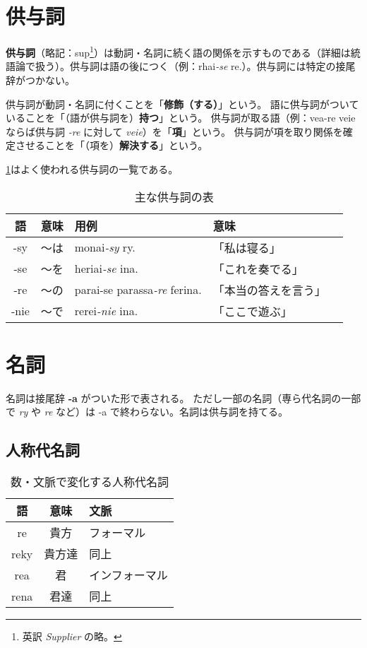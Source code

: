 \section{供与詞}

\textbf{供与詞}（略記：sup\footnote{英訳 \emph{Supplier} の略。}）は動詞・名詞に続く語の関係を示すものである（詳細は統語論で扱う）。供与詞は語の後につく（例：rhai\emph{-se} re.）。供与詞には特定の接尾辞がつかない。

供与詞が動詞・名詞に付くことを「\textbf{修飾（する）}」という。
語に供与詞がついていることを「（語が供与詞を）\textbf{持つ}」という。
供与詞が取る語（例：vea-re veie ならば供与詞 \emph{-re} に対して \emph{veie}）を「\textbf{項}」という。
供与詞が項を取り関係を確定させることを「（項を）\textbf{解決する}」という。

\cref{table:common-sups}はよく使われる供与詞の一覧である。

\begin{table}[H]
    \centering
    \caption{主な供与詞の表}
    \label{table:common-sups}
    \begin{tabular}{cclll}
        \toprule
        語 & 意味 & 用例 & 意味 \\
        \midrule
        -sy  & ～は & monai\emph{-sy} ry.                & 「私は寝る」\\
        -se  & ～を & heriai\emph{-se} ina.              & 「これを奏でる」\\
        -re  & ～の & parai-se parassa\emph{-re} ferina. & 「本当の答えを言う」\\
        -nie & ～で & rerei\emph{-nie} ina.              & 「ここで遊ぶ」 \\
        \bottomrule
    \end{tabular}
\end{table}

\section{名詞}

名詞は接尾辞 \textbf{-a} がついた形で表される。
ただし一部の名詞（専ら代名詞の一部で \emph{ry} や \emph{re} など）は -a で終わらない。名詞は供与詞を持てる。

\subsection{人称代名詞}

\begin{wraptable}[6]{r}{50mm}
    \centering
    \caption{数・文脈で変化する人称代名詞}
    \label{table:list-of-re-rea}
    \begin{tabular}{ccl}
        \toprule
        語 & 意味 & 文脈 \\
        \midrule
        re    & 貴方  & フォーマル \\
        reky  & 貴方達 & 同上 \\
        rea   & 君    & インフォーマル \\
        rena  & 君達  & 同上 \\
        \bottomrule
    \end{tabular}
\end{wraptable}

